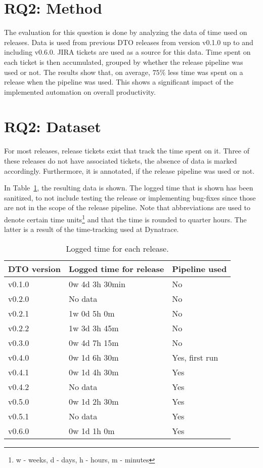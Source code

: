 \section{RQ2: Method}\label{sec:q2:-method}

The evaluation for this question is done by analyzing the data of time used on releases.
Data is used from previous DTO releases from version v0.1.0 up to and including v0.6.0.
JIRA tickets are used as a source for this data.
Time spent on each ticket is then accumulated, grouped by whether the release pipeline was used or not.
The results show that, on average, $75 \%$ less time was spent on a release when the pipeline was used.
This shows a significant impact of the implemented automation on overall productivity.

\section{RQ2: Dataset}\label{sec:q2:-dataset}

For most releases, release tickets exist that track the time spent on it.
Three of these releases do not have associated tickets, the absence of data is marked accordingly.
Furthermore, it is annotated, if the release pipeline was used or not.

In Table~\ref{tab:logged-time-for-each-release}, the resulting data is shown.
The logged time that is shown has been sanitized, to not include testing the release or implementing bug-fixes since those are not in the scope of the release pipeline.
Note that abbreviations are used to denote certain time units\footnote{w - weeks, d - days, h - hours, m - minutes} and that the time is rounded to quarter hours.
The latter is a result of the time-tracking used at Dynatrace.

\begin{table}[H]
    \centering
    \caption{Logged time for each release.}
    \label{tab:logged-time-for-each-release}
    \begin{tabular}{l|l|l}
        DTO version & Logged time for release & Pipeline used \\
        \hline
        v0.1.0 & 0w 4d 3h 30min & No \\
        v0.2.0 & No data & No \\
        v0.2.1 & 1w 0d 5h 0m & No \\
        v0.2.2 & 1w 3d 3h 45m & No \\
        v0.3.0 & 0w 4d 7h 15m & No \\
        v0.4.0 & 0w 1d 6h 30m & Yes, first run \\
        v0.4.1 & 0w 1d 4h 30m & Yes \\
        v0.4.2 & No data & Yes \\
        v0.5.0 & 0w 1d 2h 30m & Yes \\
        v0.5.1 & No data & Yes \\
        v0.6.0 & 0w 1d 1h 0m & Yes \\
    \end{tabular}
\end{table}

